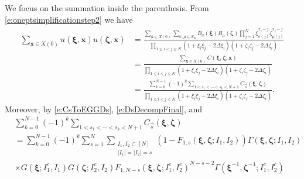 \documentclass[a4paper,11pt]{article}
\theoremstyle{definition}
\begin{document}
We focus on the summation inside the parenthesis. From \eqref{e:oneptsimplificationstep2} we have 
\begin{equation}
\begin{split}
    \sum_{\mathbf{x} \in X(0)}u(\boldsymbol{\xi}, \mathbf{x})u(\boldsymbol{\zeta}, \mathbf{x}) &= \frac{\sum_{\mathbf{x} \in X(0)}\sum_{\sigma ,\mu \in S_N} B_{\sigma}(\boldsymbol{\xi}) B_{\mu}(\boldsymbol{\zeta}) \prod_{j=1}^N \xi_{\sigma(j)}^{x_j-j}\zeta_{\mu(j)}^{x_j-j}}{\prod_{1 \leq i <j \leq N}(1 + \xi_i \xi_j - 2 \Delta \xi_i)(1 + \zeta_i \zeta_j - 2 \Delta \zeta_i)}\\
    &=\frac{\sum_{\mathbf{x} \in X(0)}C(\boldsymbol{\xi}, \boldsymbol{\zeta}; \mathbf{x})}{\prod_{1 \leq i <j \leq N}(1 + \xi_i \xi_j - 2 \Delta \xi_i)(1 + \zeta_i \zeta_j - 2 \Delta \zeta_i)}\\
    &=\frac{\sum_{k=0}^{N-1}(-1)^k \sum_{1< s_1 < \cdots < s_k < N+1}C_{\vec{s}}(\boldsymbol{\xi}, \boldsymbol{\zeta})}{\prod_{1 \leq i <j \leq N}(1 + \xi_i \xi_j - 2 \Delta \xi_i)(1 + \zeta_i \zeta_j - 2 \Delta \zeta_i)}.
\end{split}
\end{equation}
Moreover, by \eqref{e:CsToEGGDs}, \eqref{e:DsDecompFinal}, and 
\begin{equation}
\begin{split}
    &\sum_{k=0}^{N-1}(-1)^k \sum_{1< s_1 < \cdots < s_k < N+1}C_{\vec{s}}(\boldsymbol{\xi}, \boldsymbol{\zeta})\\
    &= \sum_{k=0}^{N-1}(-1)^k\sum_{s = 1}^{N} \sum_{\substack{I_1, I_2 \subset [N]\\|I_1|=|I_2| = s}} (1 - F_{1, s}(\boldsymbol{\xi}, \boldsymbol{\zeta}; I_1, I_2))\Gamma(\boldsymbol{\xi}, \boldsymbol{\zeta}; I_1, I_2)\\
    &\times G(\boldsymbol{\xi}; I_1^c, I_1)G(\boldsymbol{\zeta}; I_2^c, I_2)F_{1, N-s}(\boldsymbol{\xi}, \boldsymbol{\zeta}; I_1^c, I_2^c)^{N-s-2} \Gamma(\boldsymbol{\xi}^{-1}, \boldsymbol{\zeta}^{-1}; I_1^c, I_2^c)
\end{split}
\end{equation}
\end{document}
